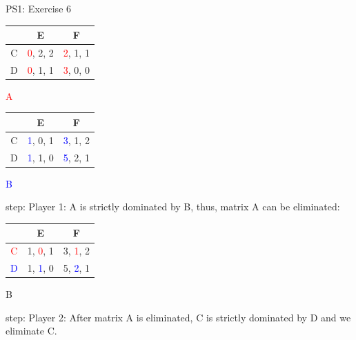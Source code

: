 \begin{frame}{PS1: Exercise 6}
\begin{multicols}{2}
\begin{table}
  \begin{tabular}{c|c|c}
      & E       & F       \\
    \midrule
    C & \textcolor{red}{0}, 2, 2 & \textcolor{red}{2}, 1, 1 \\
    \midrule
    D & \textcolor{red}{0}, 1, 1 & \textcolor{red}{3}, 0, 0
  \end{tabular}
  \center \textcolor{red}{A}
\end{table}
\vfill\null \columnbreak
\begin{table}
  \begin{tabular}{c|c|c}
      & E       & F       \\
    \midrule
    C & \textcolor{blue}{1}, 0, 1 & \textcolor{blue}{3}, 1, 2 \\
    \midrule
    D & \textcolor{blue}{1}, 1, 0 & \textcolor{blue}{5}, 2, 1
  \end{tabular}
  \center \textcolor{blue}{B}
\end{table}
\end{multicols}
 step: Player 1: A is strictly dominated by B, thus, matrix A can be eliminated:
\begin{multicols}{2}
\vfill\null \columnbreak
\begin{table}
  \begin{tabular}{c|c|c}
      & E       & F       \\
    \midrule
    \textcolor{red}{C} & 1, \textcolor{red}{0}, 1 & 3, \textcolor{red}{1}, 2 \\
    \midrule
    \textcolor{blue}{D} & 1, \textcolor{blue}{1}, 0 & 5, \textcolor{blue}{2}, 1
  \end{tabular}
  \center B
\end{table}
\end{multicols}
 step: Player 2: After matrix A is eliminated, C is strictly dominated by D and we eliminate C.
\end{frame}

